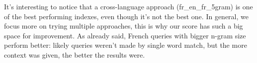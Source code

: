 It's interesting to notice that a cross-language approach (fr\_en\_fr\_5gram) is one of the best performing indexes, even though it's not the best one. %
In general, we focus more on trying multiple approaches, this is why our score has such a big space for improvement. As already said, French queries with bigger n-gram size perform better: likely queries weren't made by single word match, but the more context was given, the better the results were.\\
